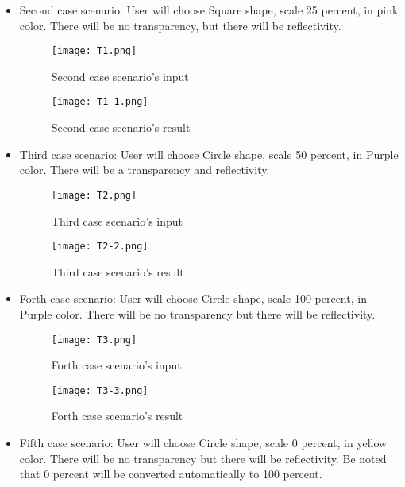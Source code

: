 \documentclass{article}
\begin{document}
\begin{itemize}
    \item Second case scenario: \newline
    User will choose Square shape, scale 25 percent, in pink color. There will be no transparency, but there will be reflectivity. 
    
   \begin{figure}[H]
\centering
\texttt{[image: T1.png]}
\caption{Second case scenario's input \label{test2}}
\end{figure}

 
 \begin{figure}
    \centering
    \texttt{[image: T1-1.png]}
    \caption{Second case scenario's result}
    \label{test2}
\end{figure}



\item Third case scenario: \newline
User will choose Circle shape, scale 50 percent, in Purple color. There will be a transparency and reflectivity. 

\begin{figure}[H]
\centering
\texttt{[image: T2.png]}
\caption{Third case scenario's input \label{test3}}
\end{figure}

\begin{figure}
    \centering
    \texttt{[image: T2-2.png]}
    \caption{Third case scenario's result}
    \label{test3}
\end{figure}

\item Forth case scenario: \newline
User will choose Circle shape, scale 100 percent, in Purple color. There will be no transparency but there will be reflectivity.

\begin{figure}[H]
\centering
\texttt{[image: T3.png]}
\caption{Forth case scenario's input \label{test4}}
\end{figure}

\begin{figure}
    \centering
    \texttt{[image: T3-3.png]}
    \caption{Forth case scenario's result}
    \label{test4}
\end{figure}

\item Fifth case scenario: \newline
User will choose Circle shape, scale 0 percent, in yellow color. There will be no transparency but there will be reflectivity. 
Be noted that 0 percent will be converted automatically to 100 percent. 




\end{itemize}
\end{document}
